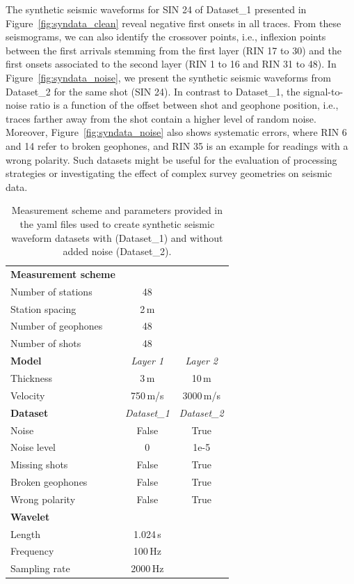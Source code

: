 \documentclass[a4paper,fleqn]{cas-sc}
\begin{document}
The synthetic seismic waveforms for SIN 24 of Dataset\_1 presented in Figure~\ref{fig:syndata_clean} reveal negative first onsets in all traces. From these seismograms, we can also identify the crossover points, i.e., inflexion points between the first arrivals stemming from the first layer (RIN 17 to 30) and the first onsets associated to the second layer (RIN 1 to 16 and RIN 31 to 48). In Figure~\ref{fig:syndata_noise}, we present the synthetic seismic waveforms from Dataset\_2 for the same shot (SIN 24). In contrast to Dataset\_1, the signal-to-noise ratio is a function of the offset between shot and geophone position, i.e., traces farther away from the shot contain a higher level of random noise. 
Moreover, Figure~\ref{fig:syndata_noise} also shows systematic errors, where RIN 6 and 14 refer to broken geophones, and RIN 35 is an example for readings with a wrong polarity.
Such datasets might be useful for the evaluation of processing strategies or investigating the effect of complex survey geometries on seismic data.
\begin{table}[pos=h]
    \caption{Measurement scheme and parameters provided in the yaml files used to create synthetic seismic waveform datasets with (Dataset\_1) and without added noise (Dataset\_2).}
    \centering
    \begin{tabular}{lcc}
        \toprule
        \textbf{Measurement scheme} & & \\
        Number of stations & 48 & \\
        Station spacing & 2\,m & \\
        Number of geophones & 48 & \\
        Number of shots & 48 & \\
        \midrule
        \textbf{Model} & \textit{Layer 1} & \textit{Layer 2} \\
		Thickness & 3\,m & 10\,m \\
        Velocity & 750\,m/s & 3000\,m/s \\
        \midrule
        \textbf{Dataset} & \textit{Dataset\_1} & \textit{Dataset\_2} \\
		Noise & False & True \\
		Noise level & 0 & 1e-5 \\
		Missing shots & False & True \\
		Broken geophones & False & True \\
		Wrong polarity & False & True \\
		\midrule
		\textbf{Wavelet} & & \\
		Length & 1.024\,s & \\
		Frequency & 100\,Hz & \\
		Sampling rate & 2000\,Hz & \\
        \bottomrule
    \end{tabular}
    \label{tab:syndata}
\end{table}
\end{document}
